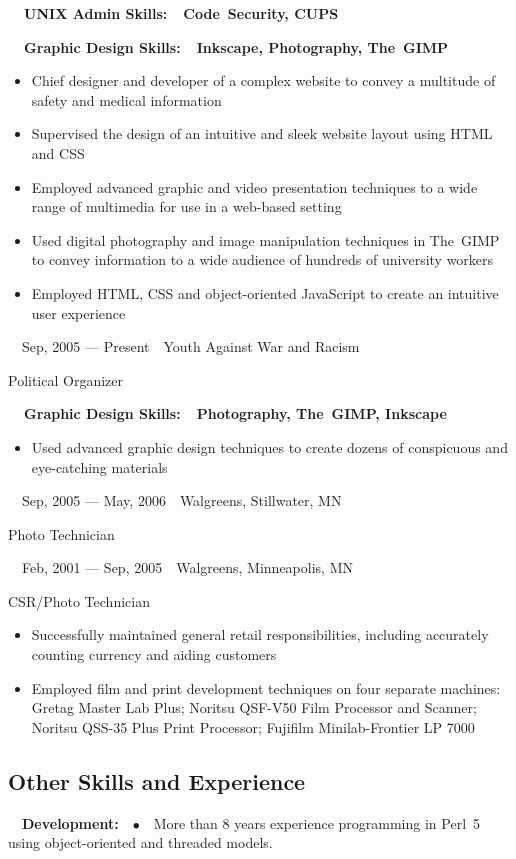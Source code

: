 \documentclass[letterpaper]{article}
\newcommand\textstyleStrongEmphasis[1]{\textbf{#1}}
\newcommand\textstyleBulletSymbols[1]{\textrm{#1}}
\newcommand\liststyleLi{%
\renewcommand\labelitemi{${\bullet}$}
\renewcommand\labelitemii{${\circ}$}
\renewcommand\labelitemiii{${\blacksquare}$}
\renewcommand\labelitemiv{${\bullet}$}
}
\begin{document}
{\bfseries
\ \ UNIX Admin Skills:\ \ Code~Security, CUPS}

{\bfseries
\ \ Graphic Design Skills:\ \ Inkscape, Photography, The~GIMP}

\liststyleLi
\begin{itemize}
\item Chief designer and developer of a complex website to convey a multitude of safety and medical information
\item Supervised the design of an intuitive and sleek website layout using HTML and CSS
\item Employed advanced graphic and video presentation techniques to a wide range of multimedia for use in a web-based setting
\item Used digital photography and image manipulation techniques in The~GIMP to convey information to a wide audience of hundreds of university workers
\item Employed HTML, CSS and object-oriented JavaScript to create an intuitive user experience
\end{itemize}
\ \ Sep, 2005 --- Present\ \ Youth Against War and Racism

Political Organizer

{\bfseries
\ \ Graphic Design Skills:\ \ Photography, The~GIMP, Inkscape}

\liststyleLi
\begin{itemize}
\item Used advanced graphic design techniques to create dozens of conspicuous and eye-catching materials
\end{itemize}
\ \ Sep, 2005 --- May, 2006\ \ Walgreens, Stillwater, MN

Photo Technician

\ \ Feb, 2001 --- Sep, 2005\ \ Walgreens, Minneapolis, MN

CSR/Photo Technician

\liststyleLi
\begin{itemize}
\item Successfully maintained general retail responsibilities, including accurately counting currency and aiding customers
\item Employed film and print development techniques on four separate machines: Gretag Master Lab Plus; Noritsu QSF-V50 Film Processor and Scanner; Noritsu QSS-35 Plus Print Processor; Fujifilm Minilab-Frontier LP 7000
\end{itemize}
\subsection[Other Skills and Experience]{Other Skills and Experience}
\ \ \textstyleStrongEmphasis{Development:}\ \ \textstyleBulletSymbols{${\bullet}$}\ \ More than 8 years experience programming in Perl~5 using object\nobreakdash-oriented and threaded models.
\end{document}

